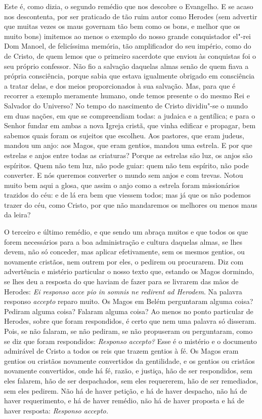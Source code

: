 Este é, como dizia, o segundo remédio que nos descobre o Evangelho. E se
acaso nos descontenta, por ser praticado de tão ruim autor como Herodes
(sem advertir que muitas vezes os maus governam tão bem como os bons,
e melhor que os muito bons) imitemos ao menos o exemplo do nosso
grande conquistador el"-rei Dom Manoel, de felicíssima memória, tão
amplificador do seu império, como do de Cristo, de quem lemos que o
primeiro sacerdote que enviou às conquistas foi o seu próprio confessor.
Não fio a salvação daquelas almas senão de quem fiava a própria
consciência, porque sabia que estava igualmente obrigado em consciência
a tratar delas, e dos meios proporcionados à sua salvação. Mas, para que
é recorrer a exemplo meramente humano, onde temos presente o do mesmo
Rei e Salvador do Universo? No tempo do nascimento de Cristo dividiu"-se
o mundo em duas nações, em que se compreendiam todas: a judaica e a
gentílica; e para o Senhor fundar em ambas a nova Igreja cristã, que
vinha edificar e propagar, bem sabemos quais foram os sujeitos que
escolheu. Aos pastores, que eram judeus, mandou um anjo: aos Magos, que
eram gentios, mandou uma estrela. E por que estrelas e anjos entre todas
as criaturas? Porque as estrelas são luz, os anjos são espíritos. Quem
não tem luz, não pode guiar: quem não tem espírito, não pode converter.
E nós queremos converter o mundo sem anjos e com trevas. Notou muito bem
aqui a glosa, que assim o anjo como a estrela foram missionários
trazidos do céu: e de lá era bem que viessem todos; mas já que os não
podemos trazer do céu, como Cristo, por que não mandaremos os melhores
ou menos maus da leira?

O terceiro e último remédio, e que sendo um abraça muitos e que todos os
que forem necessários para a boa administração e cultura daquelas almas,
se lhes devem, não só conceder, mas aplicar efetivamente, sem os mesmos
gentios, ou novamente cristãos, nem outrem por eles, o pedirem ou
procurarem. Diz com advertência e mistério particular o nosso texto que,
estando os Magos dormindo, se lhes deu a resposta do que haviam de fazer
para se livrarem das mãos de Herodes: \emph{Ei responso acce pio in
somnis ne redirent ad Herodem}. Na palavra responso
\emph{accepto} reparo muito. Os Magos em Belém perguntaram alguma coisa?
Pediram alguma coisa? Falaram alguma coisa? Ao menos no ponto particular
de Herodes, sobre que foram respondidos, é certo que nem uma palavra só
disseram. Pois, se não falaram, se não pediram, se não propuseram ou
perguntaram, como se diz que foram respondidos: \emph{Responso accepto?}
Esse é o mistério e o documento admirável de Cristo a todos os reis que
trazem gentios à fé. Os Magos eram gentios ou cristãos novamente
convertidos da gentilidade, e os gentios ou cristãos novamente
convertidos, onde há fé, razão, e justiça, hão de ser respondidos, sem
eles falarem, hão de ser despachados, sem eles requererem, hão de ser
remediados, sem eles pedirem. Não há de haver petição, e há de haver
despacho, não há de haver requerimento, e há de haver remédio, não há de
haver proposta e há de haver resposta: \emph{Responso accepto.}

